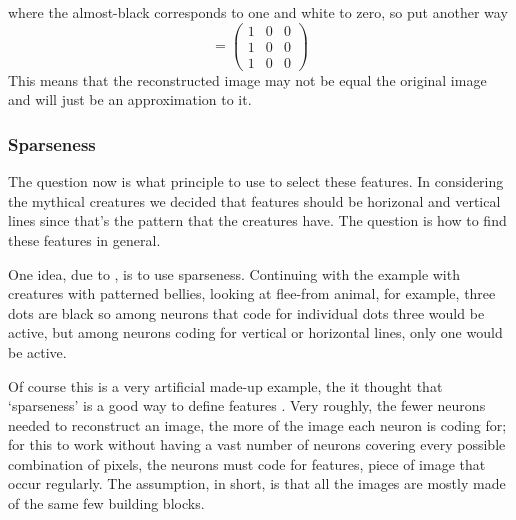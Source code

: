 \documentclass[11pt,a4paper]{scrartcl}
\begin{document}
\begin{center}
\end{center}
where the almost-black corresponds to one and white to zero, so put another way
\begin{equation}
[W^1_{ij}]=\left(\begin{array}{lll}1&0&0\\1&0&0\\1&0&0\end{array}\right)
\end{equation}
This means that the
reconstructed image may not be equal the original image and will just
be an approximation to it. 


\subsubsection*{Sparseness}

The question now is what principle to use to select these features. In
considering the mythical creatures we decided that features should be
horizonal and vertical lines since that's the pattern that the
creatures have. The question is how to find these features in general.


One idea, due to \cite{OlshausenField1996a,OlshausenField1997a}, is to
use sparseness. Continuing with the example with creatures with patterned
bellies, looking at flee-from animal, for example, three dots are
black so among neurons that code for individual dots three would be
active, but among neurons coding for vertical or horizontal lines,
only one would be active.

Of course this is a very artificial made-up example, the it thought
that \lq{}sparseness\rq{} is a good way to define features
\cite{OlshausenField1996a,OlshausenField1997a}. Very roughly, the
fewer neurons needed to reconstruct an image, the more of the image
each neuron is coding for; for this to work without having a vast
number of neurons covering every possible combination of pixels, the
neurons must code for features, piece of image that occur
regularly. The assumption, in short, is that all the images are mostly
made of the same few building blocks.
\end{document}
